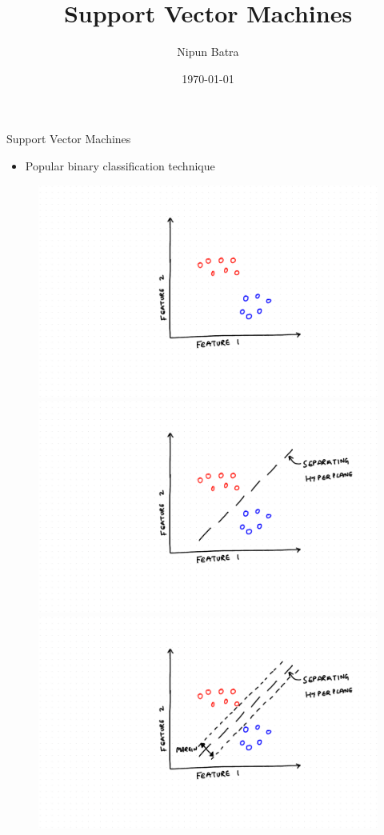 \documentclass{beamer}
\title{Support Vector Machines}
\date{\today}
\author{Nipun Batra}
\institute{IIT Gandhinagar}
\begin{document}
\maketitle


\begin{frame}{Support Vector Machines}
\begin{itemize}
	\item Popular binary classification technique
\end{itemize}

\begin{figure}
\centering
\begin{overprint}
    \includegraphics[scale = 0.4]{SVM/Svm-1.pdf}
    \includegraphics[scale = 0.4]{SVM/Svm-2.pdf}
    \includegraphics[scale = 0.4]{SVM/Svm-3.pdf}

\end{overprint}
\end{figure}
\end{frame}
\end{document}
